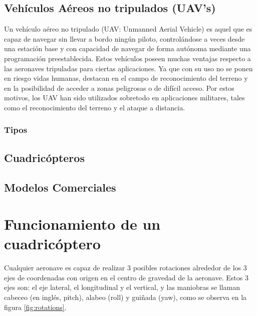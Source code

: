 \documentclass[12pt,twoside]{article}
\begin{document}
		\subsection{Vehículos Aéreos no tripulados (UAV's)}\label{subsec:UAV}
		
		Un vehículo aéreo no tripulado (UAV: Unmanned Aerial Vehicle) es aquel que es capaz de navegar sin llevar a bordo ningún piloto, 
		controlándose a veces desde una estación base y con capacidad de navegar de forma autónoma mediante una programación preestablecida.
		Estos vehículos poseen muchas ventajas respecto a las aeronaves tripuladas para ciertas aplicaciones. Ya que con su uso no se ponen en riesgo vidas humanas, 
		destacan en el campo de reconocimiento del terreno y en la posibilidad de acceder a zonas peligrosas o de difícil acceso. 
		Por estos motivos, los UAV han sido utilizados sobretodo en aplicaciones militares, tales como el reconocimiento del terreno y el ataque a distancia.
			
			\subsubsection{Tipos}\label{subsubsec:Tipos UAV}
			
		\subsection{Cuadricópteros}\label{subsec:cuadricopteros}
		
		\subsection{Modelos Comerciales}\label{subsec:comerciales}
		
\newpage
\maketitle
	\section{Funcionamiento de un cuadricóptero}\label{sec:funcionamiento}
		Cualquier aeronave es capaz de realizar 3 posibles rotaciones alrededor de los 3 ejes de coordenadas con origen en el centro de gravedad de la aeronave. 
		Estos 3 ejes son: el eje lateral, el longitudinal y el vertical, y las maniobras se llaman cabeceo (en inglés, pitch), alabeo (roll) y guiñada (yaw), como se observa en la figura \ref{fig:rotations}.
		
\end{document}
